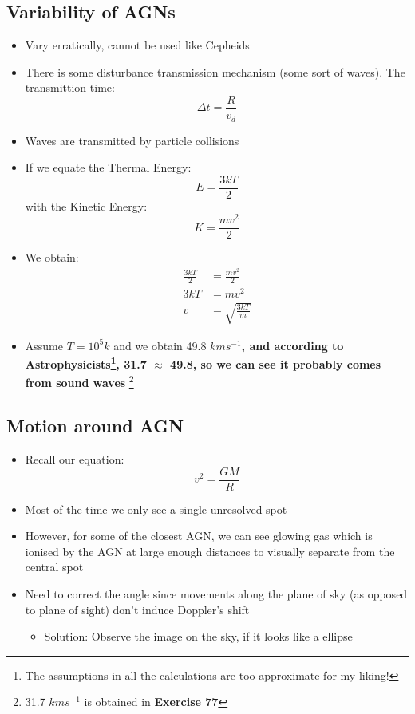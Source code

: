 \documentclass{article}
\begin{document}
\subsection{Variability of AGNs}
\begin{itemize}
\item Vary erratically, cannot be used like Cepheids
\item There is some disturbance transmission mechanism (some sort of waves). The transmittion time:
\begin{equation}
\Delta t =\frac{R}{v_d}
\end{equation}
\item Waves are transmitted by particle collisions
\item If we equate the Thermal Energy:
\begin{equation}
E=\frac{3kT}{2}
\end{equation}
with the Kinetic Energy:
\begin{equation}
K=\frac{mv^2}{2}
\end{equation}
\item We obtain:
\begin{align}
\frac{3kT}{2}&=\frac{mv^2}{2}\\
3kT&=mv^2\\
v&=\sqrt{\frac{3kT}{m}}
\end{align}
\item Assume $T=10^5k$ and we obtain 49.8 $km s^{-1}$\textbf{, and according to Astrophysicists\footnote{The assumptions in all the calculations are too approximate for my liking!}, 31.7 $\approx$ 49.8, so we can see it probably comes from sound waves	}\footnote{31.7 $kms^{-1}$ is obtained in \textbf{Exercise 77}}
\end{itemize}
\subsection{Motion around AGN}
\begin{itemize}
\item Recall our equation:
\begin{equation}
v^2=\frac{GM}{R}
\end{equation}
\item Most of the time we only see a single unresolved spot 
\item However, for some of the closest AGN, we can see glowing gas which is ionised by the AGN at large enough distances to visually separate from the central spot
\item Need to correct the angle since movements along the plane of sky (as opposed to plane of sight) don't induce Doppler's shift
\begin{itemize}
\item Solution: Observe the image on the sky, if it looks like a ellipse
\end{itemize}
\end{itemize}
\end{document}
